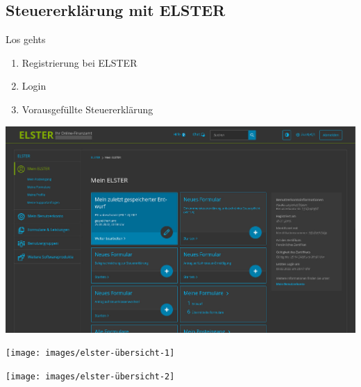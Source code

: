 \documentclass{beamer}
\begin{document}
		\subsection{Steuererklärung mit ELSTER}
		
			\begin{frame}{Los gehts}
				\begin{enumerate}
					\item Registrierung bei ELSTER
					\item Login
					\item Vorausgefüllte Steuererklärung
				\end{enumerate}
			\end{frame}
		
			\begin{frame}
				\begin{center}
					\vspace{-0.6cm}
					\hspace*{-0.91cm}
					\includegraphics[scale=0.24]{images/elster-1}
				\end{center}
			\end{frame}
		
			\begin{frame}
				\begin{center}
					\vspace{-0.6cm}
					\hspace*{-0.91cm}
					\texttt{[image: images/elster-übersicht-1]}
				\end{center}
			\end{frame}
		
			\begin{frame}
				\begin{center}
					\vspace{-0.6cm}
					\hspace*{-0.91cm}
					\texttt{[image: images/elster-übersicht-2]}
				\end{center}
			\end{frame}
		
\end{document}
